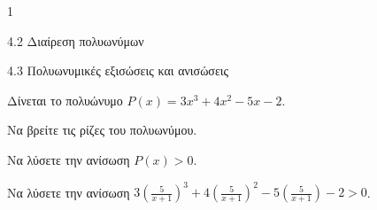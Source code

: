 \begin{ylh}{1}
\item 4.2 Διαίρεση πολυωνύμων
\item 4.3 Πολυωνυμικές εξισώσεις και ανισώσεις
\end{ylh}
Δίνεται το πολυώνυμο $P(x) = 3x^3 + 4x^2 - 5x - 2$.
\begin{alist}
\item Να βρείτε τις ρίζες του πολυωνύμου.
\item Να λύσετε την ανίσωση $P(x) > 0$.
\item Να λύσετε την ανίσωση $3\left(\frac{5}{x+1}\right)^3 + 4\left(\frac{5}{x+1}\right)^2 - 5\left(\frac{5}{x+1}\right) - 2 > 0$.
\end{alist}

